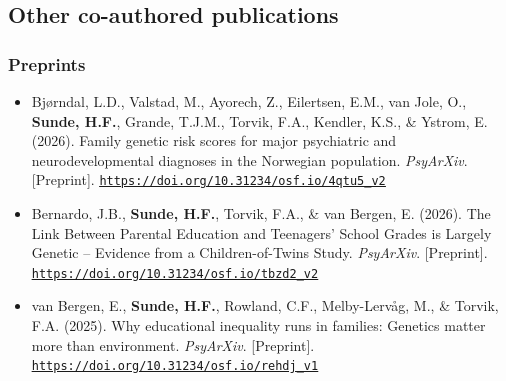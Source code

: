 \documentclass[10pt,a4paper]{article}
\let\cvhref\href
\renewcommand{\href}[2]{\cvhref{#1}{\underline{#2}}}%
\renewcommand{\url}[1]{\href{#1}{\nolinkurl{#1}}}%
\begin{document}
\subsection*{Other co-authored publications}
\subsubsection*{Preprints}
\begin{itemize}
\item Bjørndal, L.D., Valstad, M., Ayorech, Z., Eilertsen, E.M., van Jole, O., \textbf{Sunde, H.F.}, Grande, T.J.M., Torvik, F.A., Kendler, K.S., \& Ystrom, E. (2026). Family genetic risk scores for major psychiatric and neurodevelopmental diagnoses in the Norwegian population. \textit{PsyArXiv}. [Preprint]. \url{https://doi.org/10.31234/osf.io/4qtu5_v2}
\item Bernardo, J.B., \textbf{Sunde, H.F.}, Torvik, F.A., \& van Bergen, E. (2026). The Link Between Parental Education and Teenagers' School Grades is Largely Genetic -- Evidence from a Children-of-Twins Study. \textit{PsyArXiv}. [Preprint]. \url{https://doi.org/10.31234/osf.io/tbzd2_v2}
\item van Bergen, E., \textbf{Sunde, H.F.}, Rowland, C.F., Melby-Lervåg, M., \& Torvik, F.A. (2025). Why educational inequality runs in families: Genetics matter more than environment. \textit{PsyArXiv}. [Preprint]. \url{https://doi.org/10.31234/osf.io/rehdj_v1}
\end{itemize}
\end{document}
